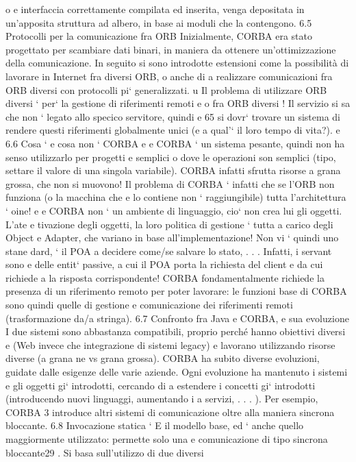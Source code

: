 \documentclass[a4paper,12pt]{article}
\begin{document}
o
e
interfaccia correttamente compilata ed inserita, venga depositata in un'apposita
struttura ad albero, in base ai moduli che la contengono.
6.5
Protocolli per la comunicazione fra ORB
Inizialmente, CORBA era stato progettato per scambiare dati binari, in maniera
da ottenere un'ottimizzazione della comunicazione. In seguito si sono introdotte
estensioni come la possibilità di lavorare in Internet fra diversi ORB, o anche di
a
realizzare comunicazioni fra ORB diversi con protocolli pi` generalizzati.
u
Il problema di utilizzare ORB diversi ` per` la gestione di riferimenti remoti
e
o
fra ORB diversi ! Il servizio si sa che non ` legato allo specico servitore, quindi
e
65
si dovr` trovare un sistema di rendere questi riferimenti globalmente unici (e
a
qual'` il loro tempo di vita?).
e
6.6
Cosa ` e cosa non ` CORBA
e
e
CORBA ` un sistema pesante, quindi non ha senso utilizzarlo per progetti
e
semplici o dove le operazioni son semplici (tipo, settare il valore di una singola
variabile). CORBA infatti sfrutta risorse a grana grossa, che non si muovono!
Il problema di CORBA ` infatti che se l'ORB non funziona (o la macchina che
e
lo contiene non ` raggiungibile) tutta l'architettura ` oine!
e
e
CORBA non ` un ambiente di linguaggio, cio` non crea lui gli oggetti. L'ate
e
tivazione degli oggetti, la loro politica di gestione ` tutta a carico degli Object
e
Adapter, che variano in base all'implementazione! Non vi ` quindi uno stane
dard, ` il POA a decidere come/se salvare lo stato, . . . Infatti, i servant sono
e
delle entit` passive, a cui il POA porta la richiesta del client e da cui richiede
a
la risposta corrispondente!
CORBA fondamentalmente richiede la presenza di un riferimento remoto
per poter lavorare: le funzioni base di CORBA sono quindi quelle di gestione e
comunicazione dei riferimenti remoti (trasformazione da/a stringa).
6.7
Confronto fra Java e CORBA, e sua evoluzione
I due sistemi sono abbastanza compatibili, proprio perché hanno obiettivi diversi
e
(Web invece che integrazione di sistemi legacy) e lavorano utilizzando risorse
diverse (a grana ne vs grana grossa).
CORBA ha subito diverse evoluzioni, guidate dalle esigenze delle varie aziende.
Ogni evoluzione ha mantenuto i sistemi e gli oggetti gi` introdotti, cercando di
a
estendere i concetti gi` introdotti (introducendo nuovi linguaggi, aumentando i
a
servizi, . . . ). Per esempio, CORBA 3 introduce altri sistemi di comunicazione
oltre alla maniera sincrona bloccante.
6.8
Invocazione statica
`
E il modello base, ed ` anche quello maggiormente utilizzato: permette solo una
e
comunicazione di tipo sincrona bloccante29 . Si basa sull'utilizzo di due diversi
\end{document}
